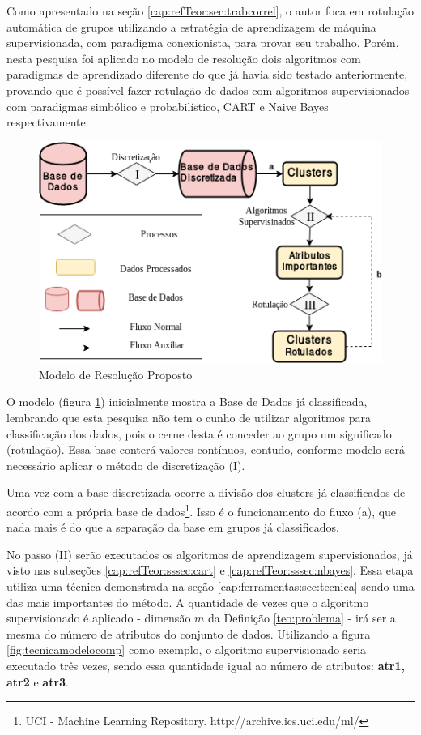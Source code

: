 Como apresentado na seção \ref{cap:refTeor:sec:trabcorrel}, o autor  foca em rotulação automática de grupos utilizando a estratégia de aprendizagem de máquina supervisionada, com paradigma conexionista, para provar seu trabalho. Porém, nesta pesquisa foi aplicado no modelo de resolução  dois algoritmos com paradigmas de aprendizado diferente do que já havia sido testado anteriormente, provando que é possível fazer rotulação de dados com  algoritmos supervisionados com paradigmas simbólico e probabilístico, CART e Naive Bayes respectivamente.


\begin{figure}[h!]
        \centering
        \includegraphics[scale=0.7]{figs/modeloResolucao.png}
        \caption{Modelo de Resolução Proposto} \label{fig:modeloresolucao}
\end{figure}

O modelo (figura \ref{fig:modeloresolucao}) inicialmente mostra a Base de Dados  já classificada, lembrando que esta pesquisa não tem o cunho de utilizar algoritmos para classificação dos dados, pois o cerne desta é conceder ao grupo um significado (rotulação). Essa base  conterá  valores contínuos, contudo, conforme modelo será necessário aplicar o método de discretização (I).

Uma vez com a base discretizada ocorre a divisão dos clusters já classificados de acordo com a própria base de dados\footnote{UCI - Machine Learning Repository. http://archive.ics.uci.edu/ml/ }. Isso é o funcionamento do fluxo (a), que nada mais é do que a separação da base em grupos já classificados. 

No passo (II) serão executados os algoritmos de aprendizagem supervisionados, já visto nas subseções \ref{cap:refTeor:sssec:cart} e \ref{cap:refTeor:sssec:nbayes}. Essa etapa utiliza uma técnica demonstrada na seção  \ref{cap:ferramentas:sec:tecnica} sendo uma das mais importantes do método. A quantidade de vezes que o algoritmo supervisionado é aplicado - dimensão ${m}$ da Definição \ref{teo:problema} -  irá ser a mesma do número de atributos do conjunto de dados. Utilizando a figura \ref{fig:tecnicamodelocomp} como exemplo, o algoritmo supervisionado seria executado três vezes, sendo essa quantidade igual ao número de atributos: \textbf{atr1, atr2} e \textbf{atr3}. 

